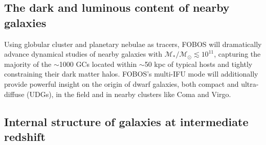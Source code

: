 
\subsection{The dark and luminous content of nearby galaxies}

Using globular cluster and planetary nebulae as tracers, FOBOS will
dramatically advance dynamical studies of nearby galaxies with
$\mathcal{M_\ast/M_\odot} \lesssim 10^{11}$, capturing the majority
of the $\sim$1000 GCs located within $\sim$50 kpc of typical hosts
\citep[see][]{2013ApJ...772...82H} and tightly constraining their
dark matter halos. FOBOS's multi-IFU mode will additionally provide
powerful insight on the origin of dwarf galaxies, both compact and
ultra-diffuse (UDGs), in the field and in nearby clusters like Coma
and Virgo.




\subsection{Internal structure of galaxies at intermediate redshift}

